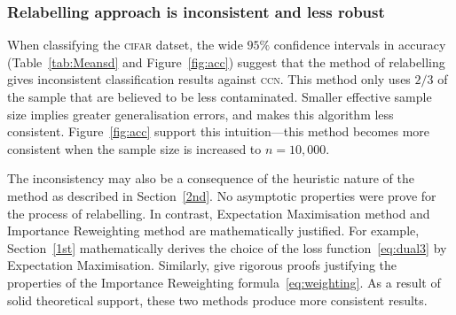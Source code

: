 \documentclass[12pt]{article} %
\begin{document}
\subsubsection{Relabelling approach is inconsistent and less robust}
When classifying the \textsc{cifar} datset, the wide $95\%$ confidence intervals in accuracy (Table~\ref{tab:Meansd} and Figure~\ref{fig:acc}) suggest that the method of relabelling gives inconsistent classification results against \textsc{ccn}. 
This method only uses $2/3$ of the sample that are believed to be less contaminated. Smaller effective sample size implies greater generalisation errors, and makes this algorithm less consistent. 
Figure~\ref{fig:acc} support this intuition---this method becomes more consistent when the sample size is increased to $n=10,000$.

The inconsistency may also be a consequence of the heuristic nature of the method as described in Section~\ref{2nd}. No asymptotic properties were prove for the process of relabelling. In contrast, Expectation Maximisation method and Importance Reweighting method are mathematically justified. For example, Section~\ref{1st} mathematically derives the choice of the loss function~\eqref{eq:dual3} by Expectation Maximisation.
Similarly, \citet{liu2016classification} give rigorous proofs justifying the properties of the Importance Reweighting formula~\eqref{eq:weighting}. As a result of solid theoretical support, these two methods produce more consistent results.
\end{document}
